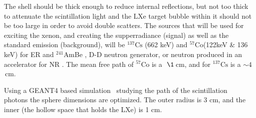 The shell should be thick enough to reduce internal reflections, but not 
too thick to attenuate the scintillation light and the LXe target bubble within it should not be too large in order to avoid double scatters. The sources that will be used for exciting the xenon, and creating the supperradiance 
(signal) as well as the standard emission (background), will be $^{137} \mathrm{Cs}$ 
(662 keV) and $^{57} \mathrm{Co}$(122keV \& 136 keV) for ER and $^{241}$AmBe , 
D-D neutron generator, or neutron produced in an accelerator for NR . The mean 
free path of $^{57} \mathrm{Co}$ is a $~\1$\,cm, and for $^{137} \mathrm{Cs}$ is a $\sim4$\,cm.

Using a GEANT4 based simulation~\cite{AGOSTINELLI2003250} studying the path of the scintillation photons the sphere dimensions are optimized. The outer radius  is 3 cm, and the inner (the hollow space that holds the LXe) is 1 cm. 
